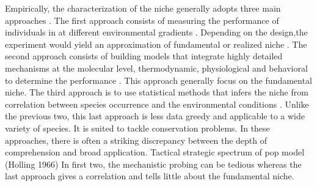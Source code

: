 
Empirically, the characterization of the niche generally adopts three main approaches \citep{Holt2009}.
The first approach consists of measuring the performance of  individuals in at different environmental gradients \citep{Birch1953, Elliott1982, Angert2005, Frazier2006}.
Depending on the design,the experiment would yield an approximation of fundamental or realized niche \citep{Birch1953, Elliott1982, Angert2005, Frazier2006}.
The second approach consists of building models that integrate highly detailed mechanisms at the molecular level, thermodynamic, physiological and behavioral to determine  the performance \citep{Kooijman2009, Kearney2009, Buckley2008}.
This approach generally focus on the fundamental niche.
The third approach is to use statistical methods that infers the niche from correlation between species occurrence and the environmental conditions \citep{Guisan2005, Austin2007, Elith2009}. %
Unlike the previous two, this last approach is less data greedy and applicable to a wide variety of species.
It is suited to tackle conservation problems.
In these approaches, there is often a striking discrepancy between the depth of comprehension and broad application.
Tactical strategic spectrum of pop model (Holling 1966)
In first two, the mechanistic probing can be tedious whereas the last approach gives a correlation and tells little about the fundamental niche.

